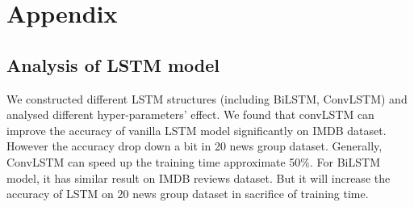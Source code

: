 \documentclass[11pt]{scrartcl}
\begin{document}



\section*{Appendix}
\subsection*{Analysis of LSTM model}
We constructed different LSTM structures (including BiLSTM\cite{graves2013hybrid}, ConvLSTM\cite{LSTM+CNN}) and analysed different hyper-parameters' effect. We found that convLSTM can improve the accuracy of vanilla LSTM model significantly on IMDB  dataset. However the accuracy drop down a bit in 20 news group dataset. Generally, ConvLSTM can speed up the training time approximate 50\%. For BiLSTM model, it has similar result on IMDB reviews dataset. But it will increase the accuracy of LSTM on 20 news group dataset in sacrifice of training time. 
\end{document}
